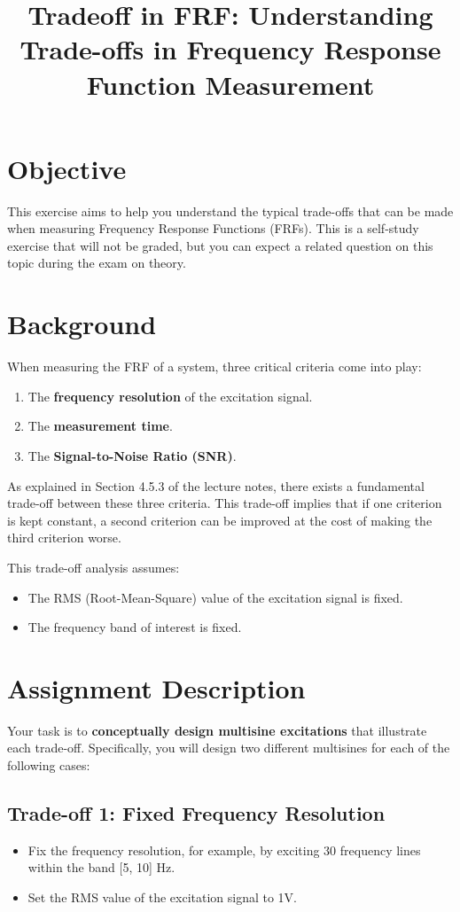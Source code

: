 \documentclass[a4paper,12pt]{article}
\title{Tradeoff in FRF: Understanding Trade-offs in Frequency Response Function Measurement}
\author{}
\date{}
\begin{document}
\maketitle

\section*{Objective}
This exercise aims to help you understand the typical trade-offs that can be made when measuring Frequency Response Functions (FRFs). This is a self-study exercise that will not be graded, but you can expect a related question on this topic during the exam on theory.

\section*{Background}
When measuring the FRF of a system, three critical criteria come into play:
\begin{enumerate}
    \item The \textbf{frequency resolution} of the excitation signal.
    \item The \textbf{measurement time}.
    \item The \textbf{Signal-to-Noise Ratio (SNR)}.
\end{enumerate}

As explained in Section 4.5.3 of the lecture notes, there exists a fundamental trade-off between these three criteria. This trade-off implies that if one criterion is kept constant, a second criterion can be improved at the cost of making the third criterion worse. 

This trade-off analysis assumes:
\begin{itemize}
    \item The RMS (Root-Mean-Square) value of the excitation signal is fixed.
    \item The frequency band of interest is fixed.
\end{itemize}

\section*{Assignment Description}
Your task is to \textbf{conceptually design multisine excitations} that illustrate each trade-off. Specifically, you will design two different multisines for each of the following cases:

\subsection*{Trade-off 1: Fixed Frequency Resolution}
\begin{itemize}
    \item Fix the frequency resolution, for example, by exciting 30 frequency lines within the band [5, 10] Hz.
    \item Set the RMS value of the excitation signal to 1V.
\end{itemize}
\end{document}
